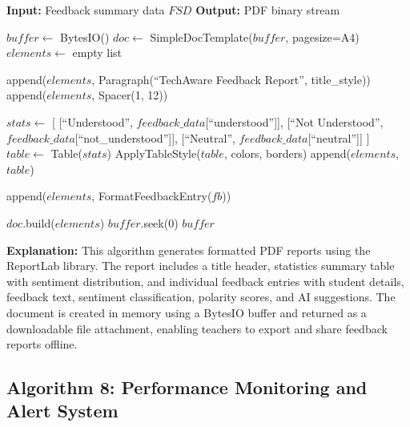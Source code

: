 \begin{algorithm}[H]
\caption{PDF Feedback Report Generation}
\begin{algorithmic}[1]

\State \textbf{Input:} Feedback summary data $FSD$
\State \textbf{Output:} PDF binary stream

    \State $buffer \gets$ BytesIO()
    \State $doc \gets$ SimpleDocTemplate($buffer$, pagesize=A4)
    \State $elements \gets$ empty list
    
    \State {}
    \State append($elements$, Paragraph(``TechAware Feedback Report'', title\_style))
    \State append($elements$, Spacer(1, 12))
    
    \State {}
    \State $stats \gets$ [
    \State \hspace{1em} [``Understood'', $feedback\_data$[``understood'']],
    \State \hspace{1em} [``Not Understood'', $feedback\_data$[``not\_understood'']],
    \State \hspace{1em} [``Neutral'', $feedback\_data$[``neutral'']]
    \State ]
    \State $table \gets$ Table($stats$)
    \State ApplyTableStyle($table$, colors, borders)
    \State append($elements$, $table$)
    
    \State {}
        \State append($elements$, FormatFeedbackEntry($fb$))
    \EndFor
    
    \State $doc$.build($elements$)
    \State $buffer$.seek(0)
    \State \Return $buffer$ 
\EndFunction

\end{algorithmic}
\end{algorithm}

\textbf{Explanation:}
This algorithm generates formatted PDF reports using the ReportLab library. The report includes a title header, statistics summary table with sentiment distribution, and individual feedback entries with student details, feedback text, sentiment classification, polarity scores, and AI suggestions. The document is created in memory using a BytesIO buffer and returned as a downloadable file attachment, enabling teachers to export and share feedback reports offline.

\subsection{Algorithm 8: Performance Monitoring and Alert System}

